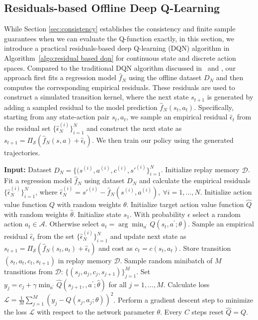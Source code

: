\documentclass[letterpaper, 10 pt, conference]{ieeeconf}  %
\begin{document}
\subsection{Residuals-based Offline Deep Q-Learning}
While Section \ref{sec:consistency} establishes the consistency and finite sample guarantees when we can evaluate the Q-function exactly, in this section, we introduce a practical residuals-based deep Q-learning (DQN) algorithm in Algorithm\ \ref{algo:residual based dqn} for continuous state and discrete action spaces. Compared to the traditional DQN algorithm discussed in\ \cite{mnih2013playing} and \cite{mnih2015human}, our approach first fits a regression model $\hat f_N$ using the offline dataset $D_N$ and then computes the corresponding empirical residuals. These residuals are used to construct a simulated transition kernel, where the next state $s_{t+1}$ is generated by adding a sampled residual to the model prediction $\hat f_N(s_t,a_t)$. Specifically, starting from any state-action pair $s_t, a_t$, we sample an empirical residual $\hat{\epsilon}_t$ from the residual set $\{\hat{\epsilon}_N^{(i)}\}_{i=1}^N$ and construct the next state as $s_{t+1}=\Pi_{\mathcal S}(\hat f_N(s,a)+\hat\epsilon_t)$. We then train our policy using the generated trajectories.
\begin{algorithm}[ht!]
\caption{Residuals-based Offline Deep Q-Learning.}
\begin{algorithmic}[1]
\label{algo:residual based dqn}
\scriptsize
\STATE \textbf{Input:} Dataset $D_N = \{(s^{(i)},a^{(i)},c^{(i)},s'^{(i)}\}_{i=1}^N$.
\STATE Initialize replay memory $\mathcal{D}$.
\STATE Fit a regression model $\hat{f}_N$ using dataset $D_N$ and calculate the empirical residuals $\{\hat{\epsilon}_N^{(i)}\}_{i=1}^N$, where $\hat{\epsilon}_N^{(i)} = s'^{(i)} - \hat{f}_N(s^{(i)},a^{(i)}),\ \forall i = 1,\ldots,N$.
\STATE Initialize action value function $Q$ with random weights $\theta$.
\STATE Initialize target action value function $\hat{Q}$ with random weights $\hat{\theta}$.
  \STATE Initialize state $s_1$.
    \STATE With probability $\epsilon$ select a random action $a_t\in\mathcal{A}$.
    \STATE Otherwise select $a_t=\arg\min_{a^{\prime}}Q(s_t,a^{\prime}; \theta)$.
    \STATE Sample an empirical residual $\hat{\epsilon}_t$ from the set $\{\hat \epsilon_N^{(i)}\}_{i=1}^N$ and update next state as $s_{t+1}= \Pi_{\mathcal S}(\hat f_N(s_t,a_t)+\hat\epsilon_t)$ and cost as $c_t=c(s_t,a_t)$.
    \STATE Store transition $(s_t, a_t, c_t, s_{t+1})$ in replay memory $\mathcal{D}$.
    \STATE Sample random minibatch of $M$ transitions  from $\mathcal{D}$: $\{(s_j, a_j, c_j, s_{j+1})\}_{j=1}^M$.
    \STATE Set $y_j = c_j + \gamma\min_{a^{\prime}}\hat{Q}(s_{j+1}, ,a^{\prime};\hat{\theta})$ for all $j=1,\ldots, M$.
      \STATE Calculate loss $\mathcal{L}=\frac{1}{M}\sum_{j=1}^M(y_j-Q(s_j, a_j; \theta))^2$.
      \STATE Perform a gradient descent step to minimize the loss $\mathcal{L}$ with respect to the network parameter $\theta$.
      \STATE Every $C$ steps reset $\hat{Q}=Q$.
  \ENDFOR
  \ENDFOR
\end{algorithmic}
\end{algorithm}
\end{document}
